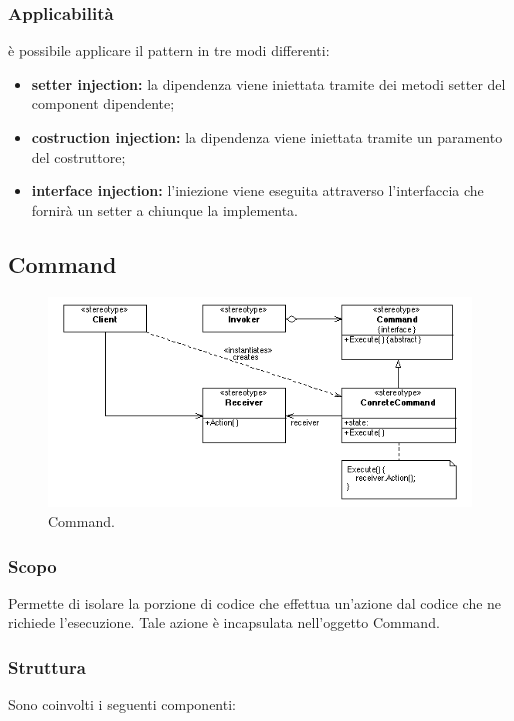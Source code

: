 \subsubsection{Applicabilità} è possibile applicare il pattern in tre modi differenti:
\begin{itemize}
	\item \textbf{setter injection:} la dipendenza viene iniettata tramite dei metodi setter del component dipendente;
	\item \textbf{costruction injection:} la dipendenza viene iniettata tramite un paramento del costruttore;
	\item \textbf{interface injection:} l'iniezione viene eseguita attraverso l'interfaccia che fornirà un setter a chiunque la implementa.
\end{itemize}

\subsection{Command}

\begin{figure} \label{fig:command}
	\includegraphics[scale=0.5]{img/command.png}
	\caption{Command.}
\end{figure}

\subsubsection{Scopo} Permette di isolare la porzione di codice che effettua un'azione dal codice che ne richiede l'esecuzione. Tale azione è incapsulata nell'oggetto Command.

\subsubsection{Struttura} Sono coinvolti i seguenti componenti:

